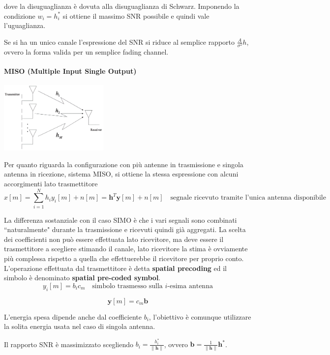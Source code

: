 dove la disuguaglianza è dovuta alla disuguaglianza di Schwarz. Imponendo la condizione $w_i = h_i^*$ si ottiene il massimo SNR possibile e quindi vale l'uguaglianza.


Se si ha un unico canale l'espressione del SNR si riduce al semplice rapporto $\frac{A}{\sigma^2}h$, ovvero la forma valida per un semplice fading channel.
\paragraph*{MISO (Multiple Input Single Output)}
\begin{center}
    \includegraphics[width=0.4\textwidth]{imgs/miso.jpg}
\end{center}
Per quanto riguarda la configurazione con più antenne in trasmissione e singola antenna in ricezione, sistema MISO, si ottiene la stessa espressione con alcuni accorgimenti lato trasmettitore
\[
    x[m] = \sum_{i=1}^{N} h_i y_i[m] + n[m] = \mathbf{h}^T \mathbf{y}[m] + n[m] \quad \text{segnale ricevuto tramite l'unica antenna disponibile}
\]

La differenza sostanziale con il caso SIMO è che i vari segnali sono combinati ``naturalmente" durante la trasmissione e ricevuti quindi già aggregati. 
La scelta dei coefficienti non può essere effettuata lato ricevitore, ma deve essere il trasmettitore a scegliere stimando il canale, lato ricevitore la stima è ovviamente più complessa rispetto a quella che effettuerebbe il ricevitore per proprio conto.
L'operazione effettuata dal trasmettitore è detta \textbf{spatial precoding} ed il simbolo è denominato \textbf{spatial pre-coded symbol}.
\[
    y_i[m] = b_i c_m \quad \text{simbolo trasmesso sulla $i$-esima antenna}
\]

\[
    \mathbf{y}[m] = c_m \mathbf{b} 
\]

L'energia spesa dipende anche dal coefficiente $b_i$, l'obiettivo è comunque utilizzare la solita energia usata nel caso di singola antenna.

Il rapporto SNR è massimizzato scegliendo $b_i = \frac{h_i^*}{ \| \mathbf{h} \| }$, ovvero $\mathbf{b} = \frac{1}{\| \mathbf{h} \|} \mathbf{h}^*$.

